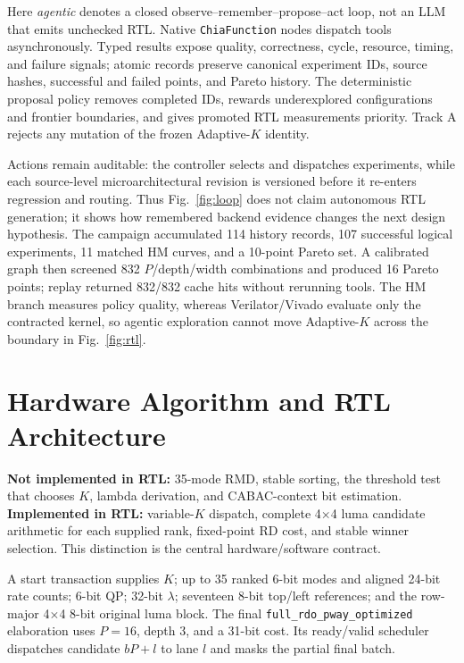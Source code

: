 \documentclass[journal]{IEEEtran}
\begin{document}
Here \emph{agentic} denotes a closed observe--remember--propose--act loop, not an
LLM that emits unchecked RTL. Native \texttt{ChiaFunction} nodes dispatch tools
asynchronously. Typed results expose quality, correctness, cycle, resource,
timing, and failure signals; atomic records preserve canonical experiment IDs,
source hashes, successful and failed points, and Pareto history. The
deterministic proposal policy removes completed IDs, rewards underexplored
configurations and frontier boundaries, and gives promoted RTL measurements
priority. Track A rejects any mutation of the frozen Adaptive-$K$ identity.

Actions remain auditable: the controller selects and dispatches experiments,
while each source-level microarchitectural revision is versioned before it
re-enters regression and routing. Thus Fig.~\ref{fig:loop} does not claim
autonomous RTL generation; it shows how remembered backend evidence changes
the next design hypothesis. The campaign accumulated 114 history records, 107
successful logical experiments, 11 matched HM curves, and a 10-point Pareto
set. A calibrated graph then screened 832 $P$/depth/width combinations and
produced 16 Pareto points; replay returned 832/832 cache hits without rerunning
tools. The HM branch measures policy quality, whereas Verilator/Vivado evaluate
only the contracted kernel, so agentic exploration cannot move Adaptive-$K$
across the boundary in Fig.~\ref{fig:rtl}.

\section{Hardware Algorithm and RTL Architecture}
\textbf{Not implemented in RTL:} 35-mode RMD, stable sorting, the threshold
test that chooses $K$, lambda derivation, and CABAC-context bit estimation.
\textbf{Implemented in RTL:} variable-$K$ dispatch, complete 4$\times$4 luma
candidate arithmetic for each supplied rank, fixed-point RD cost, and stable
winner selection. This distinction is the central hardware/software contract.

A start transaction supplies $K$; up to 35 ranked 6-bit modes and aligned
24-bit rate counts; 6-bit QP; 32-bit $\lambda$; seventeen 8-bit top/left
references; and the row-major 4$\times$4 8-bit original luma block. The final
\texttt{full\_rdo\_pway\_optimized} elaboration uses $P=16$, depth 3, and a
31-bit cost. Its ready/valid scheduler dispatches candidate $bP+l$ to lane $l$
and masks the partial final batch.
\end{document}

